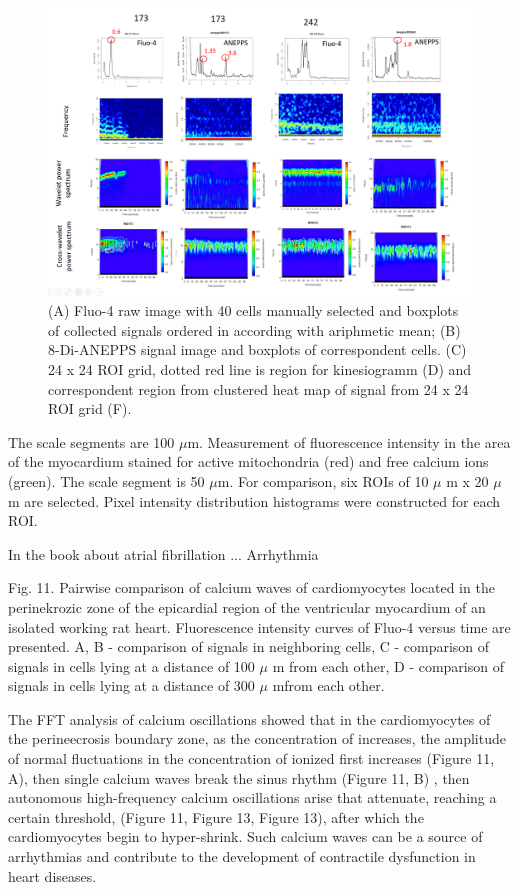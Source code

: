 \documentclass{biophys-new}
\begin{document}
\begin{figure}
    \includegraphics[width=0.9\linewidth]{fig11.png}
    \caption{(A) Fluo-4 raw image with 40 cells manually selected and  boxplots of collected signals ordered in according with ariphmetic mean; (B) 8-Di-ANEPPS signal image and boxplots of correspondent cells. (C) 24 x 24 ROI grid, dotted red line is region for kinesiogramm (D) and correspondent region from clustered heat map of signal from 24 x 24 ROI grid (F).}
    \label{fig:fig11}
\end{figure}

The scale segments are 100 $\mu$m.
Measurement of fluorescence intensity in the area of the myocardium stained for active mitochondria (red) and free calcium ions (green).
The scale segment is 50 $\mu$m.
For comparison, six ROIs of 10 $\mu$ m x 20 $\mu$ m are selected.
Pixel intensity distribution histograms were constructed for each ROI.


In the book \cite{kockskamper2002subcellular} about atrial fibrillation ...
Arrhythmia


Fig. 11. Pairwise comparison of calcium waves of cardiomyocytes located in the perinekrozic zone of the epicardial region of the ventricular myocardium of an isolated working rat heart. Fluorescence intensity curves of Fluo-4 versus time are presented. A, B - comparison of signals in neighboring cells, C - comparison of signals in cells lying at a distance of 100 $\mu$ m from each other, D - comparison of signals in cells lying at a distance of 300 $\mu$  mfrom each other.


The FFT analysis of calcium oscillations showed that in the cardiomyocytes of the perineecrosis boundary zone, as the concentration of  increases, the amplitude of normal fluctuations in the concentration of ionized  first increases (Figure 11, A), then single calcium waves break the sinus rhythm (Figure 11, B) , then autonomous high-frequency calcium oscillations arise that attenuate, reaching a certain threshold, (Figure 11, Figure 13, Figure 13), after which the cardiomyocytes begin to hyper-shrink. Such calcium waves can be a source of arrhythmias and contribute to the development of contractile dysfunction in heart diseases.
\end{document}
